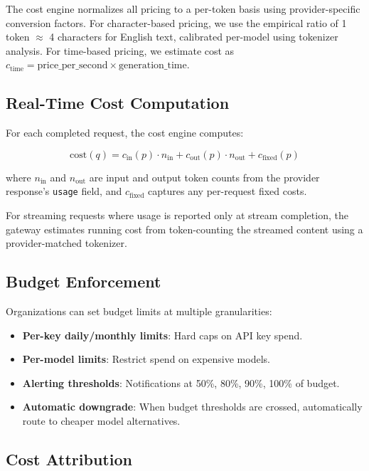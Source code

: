 \documentclass[11pt,twocolumn]{article}
\begin{document}
The cost engine normalizes all pricing to a per-token basis using provider-specific conversion factors. For character-based pricing, we use the empirical ratio of 1 token $\approx$ 4 characters for English text, calibrated per-model using tokenizer analysis. For time-based pricing, we estimate cost as $c_{\text{time}} = \text{price\_per\_second} \times \text{generation\_time}$.

\subsection{Real-Time Cost Computation}

For each completed request, the cost engine computes:

\begin{equation}
\text{cost}(q) = c_{\text{in}}(p) \cdot n_{\text{in}} + c_{\text{out}}(p) \cdot n_{\text{out}} + c_{\text{fixed}}(p)
\end{equation}

where $n_{\text{in}}$ and $n_{\text{out}}$ are input and output token counts from the provider response's \texttt{usage} field, and $c_{\text{fixed}}$ captures any per-request fixed costs.

For streaming requests where usage is reported only at stream completion, the gateway estimates running cost from token-counting the streamed content using a provider-matched tokenizer.

\subsection{Budget Enforcement}

Organizations can set budget limits at multiple granularities:

\begin{itemize}[leftmargin=*]
    \item \textbf{Per-key daily/monthly limits}: Hard caps on API key spend.
    \item \textbf{Per-model limits}: Restrict spend on expensive models.
    \item \textbf{Alerting thresholds}: Notifications at 50\%, 80\%, 90\%, 100\% of budget.
    \item \textbf{Automatic downgrade}: When budget thresholds are crossed, automatically route to cheaper model alternatives.
\end{itemize}

\subsection{Cost Attribution}
\end{document}
